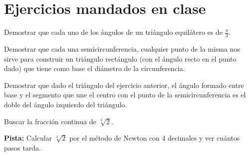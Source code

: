 \section{Ejercicios mandados en clase}
\begin{problem}[1]
Demostrar que cada uno de los ángulos de un triángulo equilátero es de $\frac{π}{3}$.
\solution
\end{problem}

\begin{problem}[2]
Demostrar que cada una semicircunferencia, cualquier punto de la misma nos sirve para construir un triángulo rectángulo (con el ángulo recto en el punto dado) que tiene como base el diámetro de la circunferencia.
\solution
\end{problem}

\begin{problem}[3]
Demostrar que dado el triángulo del ejercicio anterior, el ángulo formado entre base y el segmento que une el centro con el punto de la semicircunferencia es el doble del ángulo izquierdo del triángulo.
\solution
\end{problem}

\begin{problem}[4]
Buscar la fracción continua de $\sqrt[3]{2}$.

\textbf{Pista:} Calcular $\sqrt[3]{2}$ por el método de Newton con 4 decimales y ver cuántos pasos tarda.
\solution
\end{problem}

